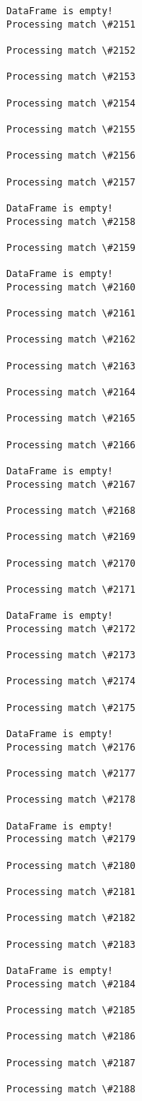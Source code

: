 \documentclass[11pt]{article}
\begin{document}
\begin{Verbatim}[commandchars=\\\{\}]
DataFrame is empty!
Processing match \#2151

Processing match \#2152

Processing match \#2153

Processing match \#2154

Processing match \#2155

Processing match \#2156

Processing match \#2157

DataFrame is empty!
Processing match \#2158

Processing match \#2159

DataFrame is empty!
Processing match \#2160

Processing match \#2161

Processing match \#2162

Processing match \#2163

Processing match \#2164

Processing match \#2165

Processing match \#2166

DataFrame is empty!
Processing match \#2167

Processing match \#2168

Processing match \#2169

Processing match \#2170

Processing match \#2171

DataFrame is empty!
Processing match \#2172

Processing match \#2173

Processing match \#2174

Processing match \#2175

DataFrame is empty!
Processing match \#2176

Processing match \#2177

Processing match \#2178

DataFrame is empty!
Processing match \#2179

Processing match \#2180

Processing match \#2181

Processing match \#2182

Processing match \#2183

DataFrame is empty!
Processing match \#2184

Processing match \#2185

Processing match \#2186

Processing match \#2187

Processing match \#2188


\end{Verbatim}
\end{document}
